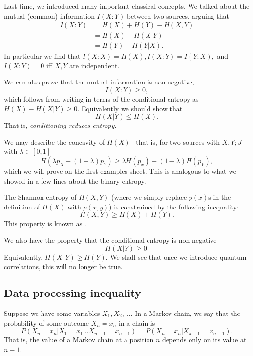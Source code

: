 Last time, we introduced many important classical concepts. We talked about the mutual (common) information $I(X:Y)$ between two sources, arguing that
\begin{align*}
    I(X:Y) &= H(X) + H(Y) - H(X,Y)\\
        &= H(X) - H(X|Y)\\
        &= H(Y)- H(Y|X).
\end{align*}
In particular we find that $I(X:X)=H(X), I(X:Y)=I(Y:X),$ and $I(X:Y)=0$ iff $X,Y$ are independent.

We can also prove that the mutual information is non-negative,
\begin{equation}
    I(X:Y) \geq 0,
\end{equation}
which follows from writing in terms of the conditional entropy as $H(X)-H(X|Y) \geq 0$. Equivalently we should show that
\begin{equation}
    H(X|Y) \leq H(X).
\end{equation}
That is, \emph{conditioning reduces entropy}.

We may describe the concavity of $H(X)$-- that is, for two sources with $X,Y; J$ with $\lambda\in [0,1]$
\begin{equation}
    H(\lambda p_X +(1-\lambda)p_Y) \geq \lambda H(p_x) + (1-\lambda) H(p_Y),
\end{equation}
which we will prove on the first examples sheet. This is analogous to what we showed in a few lines about the binary entropy.

The Shannon entropy of $H(X,Y)$ (where we simply replace $p(x)$s in the definition of $H(X)$ with $p(x,y)$) is constrained by the following inequality:
\begin{equation}
    H(X,Y) \geq H(X) + H(Y).
\end{equation}
This property is known as .

We also have the property that the conditional entropy is non-negative--
\begin{equation}
    H(X|Y) \geq 0.
\end{equation}
Equivalently, $H(X,Y) \geq H(Y)$.
We shall see that once we introduce quantum correlations, this will no longer be true.

\subsection*{Data processing inequality}
Suppose we have some variables $X_1,X_2,\ldots$. In a Markov chain, we say that the probability of some outcome $X_n=x_n$ in a chain is
\begin{equation}
    P(X_n=x_n | X_1=x_1 \ldots X_{n-1} = x_{n-1}) = P(X_n = x_n | X_{n-1} = x_{n-1}).
\end{equation}
That is, the value of a Markov chain at a position $n$ depends only on its value at $n-1$.

